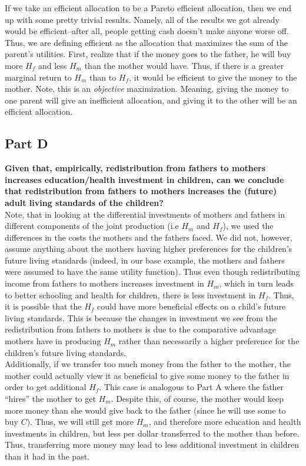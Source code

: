 \documentclass[12pt]{paper}
\begin{document}
If we take an efficient allocation to be a Pareto efficient
allocation, then we end up with some pretty trivial results. Namely,
all of the results we got already would be efficient--after all, people
getting cash doesn't make anyone worse off.
\\

Thus, we are defining efficient as the allocation that maximizes the
sum of the parent's utilities. First, realize that if the money goes
to the father, he will buy more $H_f$ and less $H_m$ than the mother
would have. Thus, if there is a greater marginal return to $H_m$ than
to $H_f$, it would be efficient to give the money to the mother. Note,
this is an \textit{objective} maximization. Meaning, giving the money
to one parent will give an inefficient allocation, and giving it to
the other will be an efficient allocation.

\subsection*{Part D}
\textbf{Given that, empirically, redistribution from fathers to mothers increases education/health investment in children, can we conclude that redistribution from fathers to mothers increases the (future) adult living standards of the children?}
\\

Note, that in looking at the differential investments of mothers and
fathers in different components of the joint production (i.e $H_m$ and
$H_f$), we used the differences in the costs the mothers and the
fathers faced. We did not, however, assume anything about the mothers
having higher preferences for the children's future living standards
(indeed, in our base example, the mothers and fathers were assumed to
have the same utility function). Thus even though redistributing
income from fathers to mothers increases investment in $H_m$, which in
turn leads to better schooling and health for children, there is less
investment in $H_f$. Thus, it is possible that the $H_f$ could have
more beneficial effects on a child's future living standards. This is
because the changes in investment we see from the redistribution from
fathers to mothers is due to the comparative advantage mothers have in
producing $H_m$ rather than necessarily a higher preference for the
children's future living standards.
\\

Additionally, if we transfer too much money from the father to the
mother, the mother could actually view it as beneficial to give some
money to the father in order to get additional $H_f$. This case is
analogous to Part A where the father ``hires'' the mother to get
$H_m$. Despite this, of course, the mother would keep more money than
she would give back to the father (since he will use some to buy
$C$). Thus, we will still get more $H_m$, and therefore more education
and health investments in children, but less per dollar transferred to
the mother than before. Thus, transferring more money may lead to less
additional investment in children than it had in the past.
\end{document}

